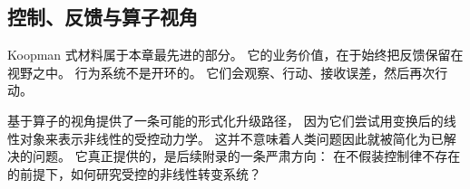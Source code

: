 \subsection{控制、反馈与算子视角}

Koopman 式材料属于本章最先进的部分。
它的业务价值，在于始终把反馈保留在视野之中。
行为系统不是开环的。
它们会观察、行动、接收误差，然后再次行动。

\begin{discussion}
基于算子的视角提供了一条可能的形式化升级路径，
因为它们尝试用变换后的线性对象来表示非线性的受控动力学。
这并不意味着人类问题因此就被简化为已解决的问题。
它真正提供的，是后续附录的一条严肃方向：
在不假装控制律不存在的前提下，如何研究受控的非线性转变系统？
\end{discussion}